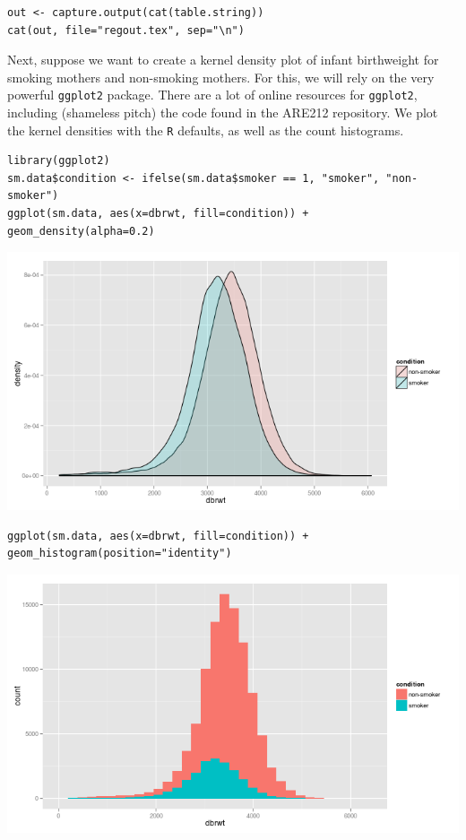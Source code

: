 \documentclass{article}
\begin{document}
\begin{verbatim}
out <- capture.output(cat(table.string))
cat(out, file="regout.tex", sep="\n")
\end{verbatim}

Next, suppose we want to create a kernel density plot of infant
birthweight for smoking mothers and non-smoking mothers.  For this, we
will rely on the very powerful \texttt{ggplot2} package.  There are a lot of
online resources for \texttt{ggplot2}, including (shameless pitch) the code
found in the ARE212 repository.  We plot the kernel densities with the
\texttt{R} defaults, as well as the count histograms.


\begin{verbatim}
library(ggplot2)
sm.data$condition <- ifelse(sm.data$smoker == 1, "smoker", "non-smoker")
ggplot(sm.data, aes(x=dbrwt, fill=condition)) + geom_density(alpha=0.2)
\end{verbatim}

\includegraphics[width=.9\linewidth]{fig1.png}



\begin{verbatim}
ggplot(sm.data, aes(x=dbrwt, fill=condition)) + geom_histogram(position="identity")
\end{verbatim}

\includegraphics[width=.9\linewidth]{fig2.png}
\end{document}
